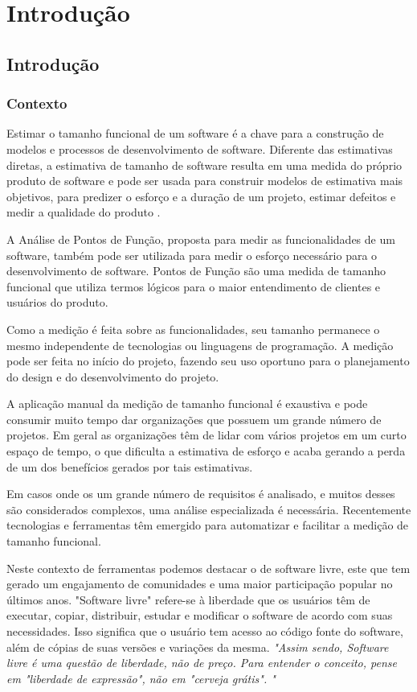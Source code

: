 \part{Introdução}

\chapter[Introdução]{Introdução}

\section{Contexto}

Estimar o tamanho funcional de um software é a chave para a construção de modelos e processos de desenvolvimento de software. Diferente das estimativas diretas, a estimativa de tamanho de software resulta em uma medida do próprio produto de software e pode ser usada para construir modelos de estimativa mais objetivos, para predizer o esforço e a duração de um projeto, estimar defeitos e medir a qualidade do produto \cite{Ebert:2014}.

A Análise de Pontos de Função, proposta para medir as funcionalidades de um software, também pode ser utilizada para medir o esforço necessário para o desenvolvimento de software. Pontos de Função são uma medida de tamanho funcional que utiliza termos lógicos para o maior entendimento de clientes e usuários do produto. \cite{Albrecht:1994}

Como a medição é feita sobre as funcionalidades, seu tamanho permanece o mesmo independente de tecnologias ou linguagens de programação. A medição pode ser feita no início do projeto, fazendo seu uso oportuno para o planejamento do design e do desenvolvimento do projeto. \cite{Kusumoto:2002}

A aplicação manual da medição de tamanho funcional é exaustiva e pode consumir muito tempo dar organizações que possuem um grande número de projetos. Em geral as organizações têm de lidar com vários projetos em um curto espaço de tempo, o que dificulta a estimativa de esforço e acaba gerando a perda de um dos benefícios gerados por tais estimativas. \cite{Ebert:2014}

Em casos onde os um grande número de requisitos é analisado, e muitos desses são considerados complexos, uma análise especializada é necessária. Recentemente tecnologias e ferramentas têm emergido para automatizar e facilitar a medição de tamanho funcional. \cite{Ebert:2014}

Neste contexto de ferramentas podemos destacar o de software livre, este que tem gerado um engajamento de comunidades e uma maior participação popular no últimos anos. \cite{Eilola:2002} \nocite{Anota:2016} "Software livre"  refere-se à liberdade que os usuários têm de executar, copiar, distribuir, estudar e modificar o software de acordo com suas necessidades. Isso significa que o usuário tem acesso ao código fonte do software, além de cópias de suas versões e variações da mesma. \cite{Stallman:2003}\textit{"Assim sendo, Software livre é uma questão de liberdade, não de preço. Para entender o conceito, pense em "liberdade de expressão", não em "cerveja grátis". "} \cite{Stallman:2003}

